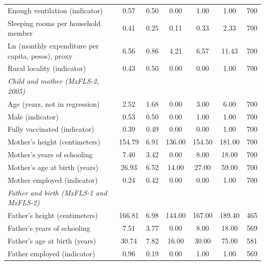 \documentclass[12pt]{article}
\begin{document}
\begin{longtable}{l*{6}{c}}
Enough ventilation (indicator)&        0.57&        0.50&        0.00&        1.00&        1.00&         700\\
Sleeping rooms per household member&        0.41&        0.25&        0.11&        0.33&        2.33&         700\\
Ln (monthly expenditure per capita, pesos), proxy&        6.56&        0.86&        4.21&        6.57&       11.43&         700\\
Rural locality (indicator)&        0.43&        0.50&        0.00&        0.00&        1.00&         700\\
\addlinespace[6pt]\textit{Child and mother (MxFLS-2, 2005)}&            &            &            &            &            &            \\
Age (years, not in regression)&        2.52&        1.68&        0.00&        3.00&        6.00&         700\\
Male (indicator)    &        0.53&        0.50&        0.00&        1.00&        1.00&         700\\
Fully vaccinated (indicator)&        0.39&        0.49&        0.00&        0.00&        1.00&         700\\
Mother's height (centimeters)&      154.79&        6.91&      136.00&      154.50&      181.00&         700\\
Mother's years of schooling&        7.40&        3.42&        0.00&        8.00&       18.00&         700\\
Mother's age at birth (years)&       26.93&        6.52&       14.00&       27.00&       59.00&         700\\
Mother employed (indicator)&        0.24&        0.42&        0.00&        0.00&        1.00&         700\\
\addlinespace[6pt]\textit{Father and birth (MxFLS-1 and MxFLS-2)}&            &            &            &            &            &            \\
Father's height (centimeters)&      166.81&        6.98&      144.00&      167.00&      189.40&         465\\
Father's years of schooling&        7.51&        3.77&        0.00&        8.00&       18.00&         569\\
Father's age at birth (years)&       30.74&        7.82&       16.00&       30.00&       75.00&         581\\
Father employed (indicator)&        0.96&        0.19&        0.00&        1.00&        1.00&         569\\

\end{longtable}
\end{document}

